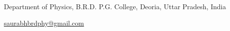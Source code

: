 Department of Physics, B.R.D. P.G. College, Deoria, Uttar Pradesh, India

\href{mailto:saurabhbrdphy@gmail.com}{saurabhbrdphy@gmail.com}
